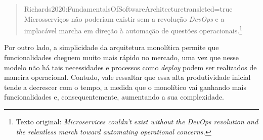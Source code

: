 \begin{quotation}{Richards2020:FundamentalsOfSoftwareArchitecture}{transleted=true}
    Microsserviços não poderiam existir sem a revolução \textit{DevOps} e a implacável marcha em direção à
    automação de questões operacionais.\footnote{Texto original: \textit{Microservices couldn't exist
    without the DevOps revolution and the relentless march toward automating operational concerns.}}
\end{quotation}

Por outro lado, a simplicidade da arquitetura monolítica permite que funcionalidades cheguem muito
mais rápido no mercado, uma vez que nesse modelo não há tais necessidades e processos como
\textit{deploy} podem ser realizados de maneira operacional. Contudo, vale ressaltar que essa alta
produtividade inicial tende a decrescer com o tempo, a medida que o monolítico vai ganhando mais
funcionalidades e, consequentemente, aumentando a sua complexidade.

